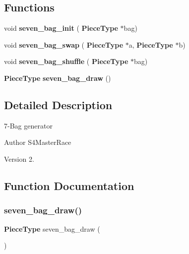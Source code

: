 \subsection*{Functions}
\begin{DoxyCompactItemize}
\item 
void \textbf{ seven\+\_\+bag\+\_\+init} (\textbf{ Piece\+Type} $\ast$bag)
\item 
void \textbf{ seven\+\_\+bag\+\_\+swap} (\textbf{ Piece\+Type} $\ast$a, \textbf{ Piece\+Type} $\ast$b)
\item 
void \textbf{ seven\+\_\+bag\+\_\+shuffle} (\textbf{ Piece\+Type} $\ast$bag)
\item 
\textbf{ Piece\+Type} \textbf{ seven\+\_\+bag\+\_\+draw} ()
\end{DoxyCompactItemize}


\subsection{Detailed Description}
7-\/\+Bag generator 

\begin{DoxyAuthor}{Author}
S4\+Master\+Race 
\end{DoxyAuthor}
\begin{DoxyVersion}{Version}
2. 
\end{DoxyVersion}


\subsection{Function Documentation}
\mbox{\label{seven__bag_8h_a0da96f6a10a01d042e8b9487adb170d2}} 
\subsubsection{seven\+\_\+bag\+\_\+draw()}
{\footnotesize\ttfamily \textbf{ Piece\+Type} seven\+\_\+bag\+\_\+draw (\begin{DoxyParamCaption}{ }\end{DoxyParamCaption})}

\mbox{\label{seven__bag_8h_aaae86f9bd2c910ea459ee626ab35ad28}} 
